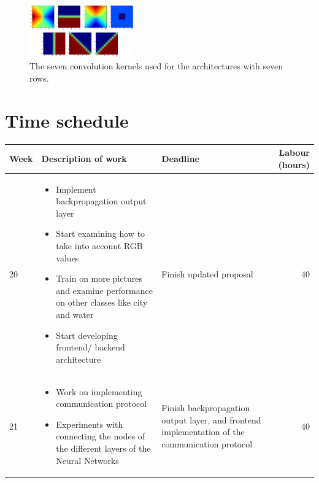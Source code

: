 \documentclass[a4paper,onecolumn]{report}
\begin{document}
\begin{figure}[bth]
	\centering
	\includegraphics[width=0.4\textwidth]{./images/7filters.jpg}
	\caption{The seven convolution kernels used for the architectures with seven rows.}
	\label{fig:7filters}
\end{figure}


\chapter{Time schedule}
\begin{center}
  \begin{tabular}{| l | p{5cm}| p{5cm} | r | }
    \hline
    \textbf{Week} & \textbf{Description of work} & \textbf{Deadline} & \textbf{Labour (hours)} \\ \hline \hline
	20 & \begin{itemize} \vspace{-1.75em} \item Implement backpropagation output layer\vspace{-1em}
	\item Start examining how to take into account RGB values \vspace{-1em}
	\item Train on more pictures and examine performance on  other classes like city and water \vspace{-1em}
	\item Start developing frontend/ backend architecture
	\end{itemize}
	& Finish updated proposal & 40 					\\	\hline	
	21 &  \begin{itemize} \vspace{-1.75em} \item Work on implementing communication protocol\vspace{-1em}
	\item Experiments with connecting the nodes of the different layers of the Neural Networks \vspace{-1em}
	\end{itemize}
	& Finish backpropagation output layer, and frontend implementation of the communication protocol& 40 					\\	\hline

\end{tabular}
\end{center}
\end{document}
